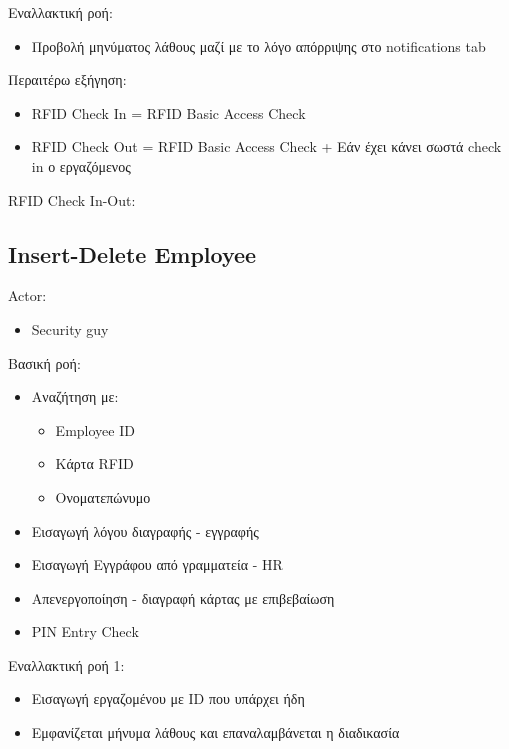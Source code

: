 \documentclass{article}
\begin{document}
\noindent Εναλλακτική ροή: 
\begin{itemize}
    \item Προβολή μηνύματος λάθους μαζί με το λόγο απόρριψης στο notifications tab
\end{itemize}

\noindent Περαιτέρω εξήγηση:
\begin{itemize}
\item RFID Check In = RFID Basic Access Check
\item RFID Check Out = RFID Basic Access Check + Εάν έχει κάνει σωστά check in ο εργαζόμενος
\end{itemize}

\newpage
\noindent RFID Check In-Out: \\
\noindent{}
\newpage

\subsection{Insert-Delete Employee}

\noindent Actor:
\begin{itemize}
    \item Security guy
\end{itemize}

\noindent Βασική ροή:
\begin{itemize}
    \item Aναζήτηση με:
    \begin{itemize}
        \item Employee ID
        \item Κάρτα RFID
        \item Ονοματεπώνυμο
    \end{itemize}
    \item Εισαγωγή λόγου διαγραφής - εγγραφής
    \item Εισαγωγή Εγγράφου από γραμματεία - HR
    \item Απενεργοποίηση - διαγραφή κάρτας με επιβεβαίωση
    \item PIN Entry Check
\end{itemize}

\noindent Εναλλακτική ροή 1: 
\begin{itemize}
    \item Εισαγωγή εργαζομένου με ID που υπάρχει ήδη
    \item Εμφανίζεται μήνυμα λάθους και επαναλαμβάνεται η διαδικασία
\end{itemize}
\end{document}
